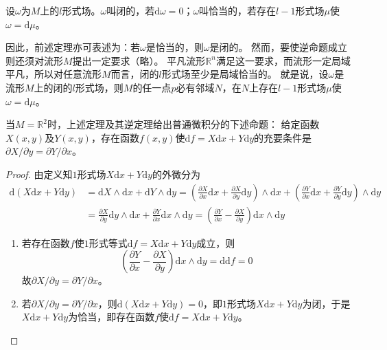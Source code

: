 \begin{definition}
    设$\omega$为$M$上的$l$形式场。$\omega$叫闭的，若$\mathrm{d}\omega = 0$；$\omega$叫恰当的，若存在$l - 1$形式场$\mu$使$\omega = \mathrm{d}\mu$。
\end{definition}

因此，前述定理亦可表述为：若$\omega$是恰当的，则$\omega$是闭的。
然而，要使逆命题成立则还须对流形$M$提出一定要求（略）。
平凡流形$\mathbb{R}^n$满足这一要求，而流形一定局域平凡，所以对任意流形$M$而言，闭的$l$形式场至少是局域恰当的。
就是说，设$\omega$是流形$M$上的闭的$l$形式场，则$M$的任一点$p$必有邻域$N$，在$N$上存在$l - 1$形式场$\mu$使$\omega = \mathrm{d}\mu$。

\begin{theorem}
    当$M = \mathbb{R}^2$时，上述定理及其逆定理给出普通微积分的下述命题：
    给定函数$X(x, y)$及$Y(x, y)$，存在函数$f(x, y)$使$\mathrm{d}f = X\mathrm{d}x + Y\mathrm{d}y$的充要条件是$\partial X / \partial y = \partial Y / \partial x$。
\end{theorem}

\begin{proof}
    由定义知$1$形式场$X\mathrm{d}x + Y\mathrm{d}y$的外微分为
    \[\begin{split}
        \mathrm{d}(X\mathrm{d}x + Y\mathrm{d}y) &= \mathrm{d}X \wedge \mathrm{d}x + \mathrm{d}Y \wedge \mathrm{d}y = (\frac{\partial X}{\partial x}\mathrm{d}x + \frac{\partial X}{\partial y}\mathrm{d}y)\wedge\mathrm{d}x + (\frac{\partial Y}{\partial x}\mathrm{d}x + \frac{\partial Y}{\partial y}\mathrm{d}y)\wedge\mathrm{d}y \\
        &= \frac{\partial X}{\partial y}\mathrm{d}y \wedge \mathrm{d}x + \frac{\partial Y}{\partial x}\mathrm{d}x \wedge \mathrm{d}y = (\frac{\partial Y}{\partial x} - \frac{\partial X}{\partial y})\mathrm{d}x \wedge \mathrm{d}y
    \end{split}\]
    \begin{enumerate}[（A）]
        \item 若存在函数$f$使$1$形式等式$\mathrm{d}f = X\mathrm{d}x + Y\mathrm{d}y$成立，则
        $$(\frac{\partial Y}{\partial x} - \frac{\partial X}{\partial y})\mathrm{d}x \wedge \mathrm{d}y = \mathrm{d}\mathrm{d}f = 0$$
        故$\partial X / \partial y = \partial Y / \partial x$。
        \item 若$\partial X / \partial y = \partial Y / \partial x$，则$\mathrm{d}(X\mathrm{d}x + Y\mathrm{d}y) = 0$，即$1$形式场$X\mathrm{d}x + Y\mathrm{d}y$为闭，于是$X\mathrm{d}x + Y\mathrm{d}y$为恰当，即存在函数$f$使$\mathrm{d}f = X\mathrm{d}x + Y\mathrm{d}y$。
    \end{enumerate}
\end{proof}

